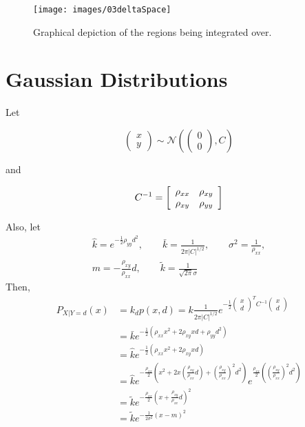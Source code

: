 \begin{figure}[ht!]
\centering
\texttt{[image: images/03deltaSpace]}
\caption{Graphical depiction of the regions being integrated over.}%
\label{fig:03deltaSpace}
\end{figure}

\section{Gaussian Distributions}
Let

\begin{equation*}
\left(\begin{array}{c}x \\y\end{array}\right) \sim\mathcal{N}\left(\left(\begin{array}{c}0\\0\end{array}\right), C\right)
\end{equation*}

and

\begin{equation*}
C^{-1} = \left[\begin{array}{c c} \rho_{xx} & \rho_{xy} \\ \rho_{xy} & \rho_{yy} \end{array}\right]
\end{equation*}

Also, let
\begin{align*}
\hat{k}=e^{-\frac{1}{2}\rho_{yy}d^2}, \qquad \bar{k}=\frac{1}{2\pi|C|^{1/2}},\qquad \sigma^2=\frac{1}{\rho_{xx}}, \\ m=-\frac{\rho_{xy}}{\rho_{xx}}d, \qquad \tilde{k}=\frac{1}{\sqrt{2\pi}\sigma}
\end{align*}
Then,
\begin{align*}
P_{X|Y=d}(x) &= k_d p(x,d) = k\frac{1}{2\pi|C|^{1/2}} e^{-\frac{1}{2}\left(\begin{array}{c}x\\d\end{array}\right)^T C^{-1} \left(\begin{array}{c}x\\d\end{array}\right)} \\
&= \bar{k}e^{-\frac{1}{2}\left(\rho_{xx}x^2+2\rho_{xy}xd+\rho_{yy}d^2\right)} \\
&= \hat{k}e^{-\frac{1}{2}\left(\rho_{xx}x^2+2\rho_{xy}xd\right)} \\
&= \hat{k}e^{-\frac{\rho_{xx}}{2}\left(x^2 + 2x(\frac{\rho_{xy}}{\rho_{xx}}d) + {(\frac{\rho_{xy}}{\rho_{xx}})}^2 d^2\right)} e^{\frac{\rho_{xx}}{2}\left({(\frac{\rho_{xy}}{\rho_{xx}})}^2 d^2\right)} \\
&= \tilde{k}e^{-\frac{\rho_{xx}}{2}{\left(x+\frac{\rho_{xy}}{\rho_{xx}}d\right)}^2} \\
&= \tilde{k}e^{-\frac{1}{2\sigma^2}{\left(x-m\right)}^2}
\end{align*}

